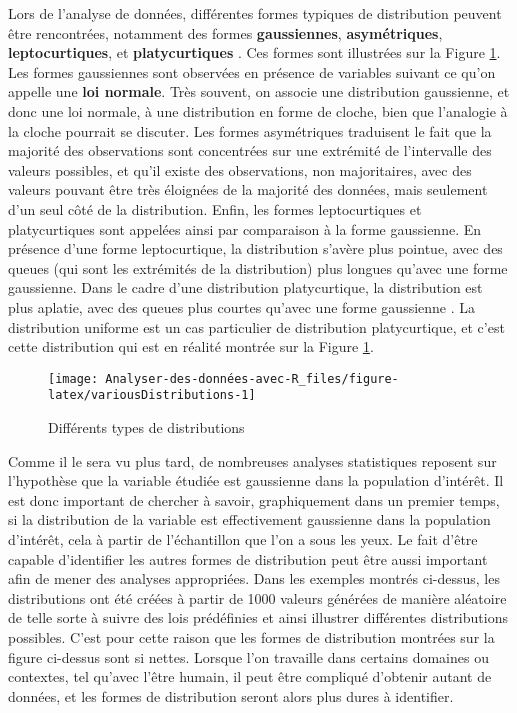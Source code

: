 \documentclass[
  french,
]{book}
\begin{document}
Lors de l'analyse de données, différentes formes typiques de distribution peuvent être rencontrées, notamment des formes \textbf{gaussiennes}, \textbf{asymétriques}, \textbf{leptocurtiques}, et \textbf{platycurtiques} \autocite{dartCommentDecrireDistribution2003}. Ces formes sont illustrées sur la Figure \ref{fig:variousDistributions}. Les formes gaussiennes sont observées en présence de variables suivant ce qu'on appelle une \textbf{loi normale}. Très souvent, on associe une distribution gaussienne, et donc une loi normale, à une distribution en forme de cloche, bien que l'analogie à la cloche pourrait se discuter. Les formes asymétriques traduisent le fait que la majorité des observations sont concentrées sur une extrémité de l'intervalle des valeurs possibles, et qu'il existe des observations, non majoritaires, avec des valeurs pouvant être très éloignées de la majorité des données, mais seulement d'un seul côté de la distribution. Enfin, les formes leptocurtiques et platycurtiques sont appelées ainsi par comparaison à la forme gaussienne. En présence d'une forme leptocurtique, la distribution s'avère plus pointue, avec des queues (qui sont les extrémités de la distribution) plus longues qu'avec une forme gaussienne. Dans le cadre d'une distribution platycurtique, la distribution est plus aplatie, avec des queues plus courtes qu'avec une forme gaussienne \autocite{dartCommentDecrireDistribution2003}. La distribution uniforme est un cas particulier de distribution platycurtique, et c'est cette distribution qui est en réalité montrée sur la Figure \ref{fig:variousDistributions}.

\begin{figure}

{\centering \texttt{[image: Analyser-des-données-avec-R\_files/figure-latex/variousDistributions-1]} 

}

\caption{Différents types de distributions}\label{fig:variousDistributions}
\end{figure}

Comme il le sera vu plus tard, de nombreuses analyses statistiques reposent sur l'hypothèse que la variable étudiée est gaussienne dans la population d'intérêt. Il est donc important de chercher à savoir, graphiquement dans un premier temps, si la distribution de la variable est effectivement gaussienne dans la population d'intérêt, cela à partir de l'échantillon que l'on a sous les yeux. Le fait d'être capable d'identifier les autres formes de distribution peut être aussi important afin de mener des analyses appropriées. Dans les exemples montrés ci-dessus, les distributions ont été créées à partir de 1000 valeurs générées de manière aléatoire de telle sorte à suivre des lois prédéfinies et ainsi illustrer différentes distributions possibles. C'est pour cette raison que les formes de distribution montrées sur la figure ci-dessus sont si nettes. Lorsque l'on travaille dans certains domaines ou contextes, tel qu'avec l'être humain, il peut être compliqué d'obtenir autant de données, et les formes de distribution seront alors plus dures à identifier.
\end{document}
